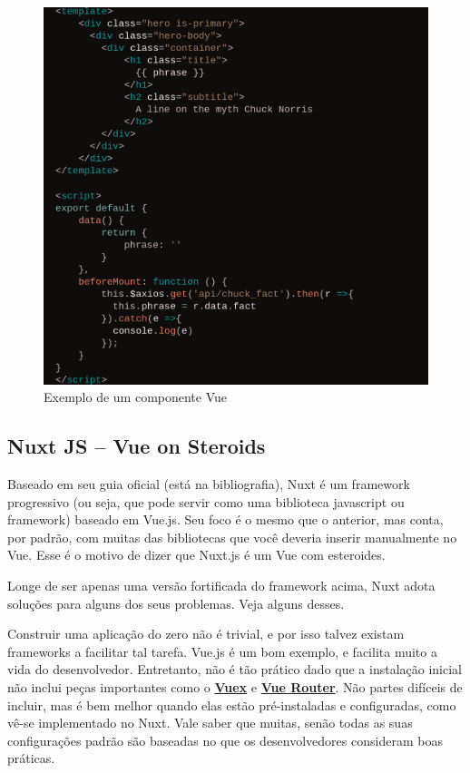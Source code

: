 \begin{figure}[htb]
    \centering
    \includegraphics[width=.7\textwidth]{figuras/vue_template.png}
    \caption{Exemplo de um componente Vue}
    \label{fig:vue-example}
\end{figure}

\subsection[Nuxt JS]{Nuxt JS -- Vue on Steroids}\label{subsec:nuxt-js}

Baseado em seu guia oficial (está na bibliografia), Nuxt é um framework progressivo (ou seja, que
pode servir como uma biblioteca javascript ou framework) baseado em Vue.js. Seu foco é o mesmo que
o anterior, mas conta, por padrão, com muitas das bibliotecas que você deveria inserir manualmente
no Vue. Esse é o motivo de dizer que Nuxt.js é um Vue com esteroides.

Longe de ser apenas uma versão fortificada do framework acima, Nuxt adota soluções para alguns dos
seus problemas. Veja alguns desses.

Construir uma aplicação do zero não é trivial, e por isso talvez existam frameworks a facilitar tal
tarefa. Vue.js é um bom exemplo, e facilita muito a vida do desenvolvedor. Entretanto, não é tão
prático dado que a instalação inicial não inclui peças importantes como o
\href{https://vuex.vuejs.org/}{\textbf{Vuex}} e \href{https://router.vuejs.org/}{\textbf{Vue Router}}.
Não partes difíceis de incluir, mas é bem melhor quando elas estão pré-instaladas e configuradas,
como vê-se implementado no Nuxt. Vale saber que muitas, senão todas as suas configurações padrão são
baseadas no que os desenvolvedores consideram boas práticas.

